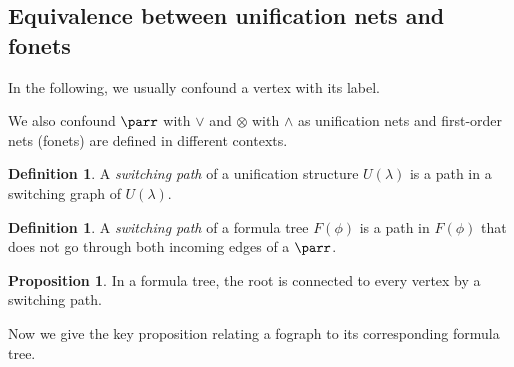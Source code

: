 \documentclass{article}
\theoremstyle{definition}
\newtheorem{definition}[thm]{Definition}
\newtheorem{proposition}[thm]{Proposition}
\begin{document}
\subsection{Equivalence between unification nets and fonets}
In the following, we usually confound a vertex with its label. 

We also confound $\parr$ with $\vee$ and $\otimes$ with $\wedge$ as unification
nets and first-order nets (fonets) are defined in different contexts.

\begin{definition} A \textit{switching path} of a unification structure $U(\lambda)$ is a path in a switching graph of $U(\lambda)$.
\end{definition}

\begin{definition} A \textit{switching path} of a  formula tree $F(\phi)$ is a path in $F(\phi)$ that does not go through both incoming edges of a $\parr$.
\end{definition}

\begin{proposition}
\label{prop1}
In a formula tree, the root is connected to every vertex by a switching path.
\end{proposition}

Now we give the key proposition relating a fograph to its corresponding formula
tree.
\end{document}
